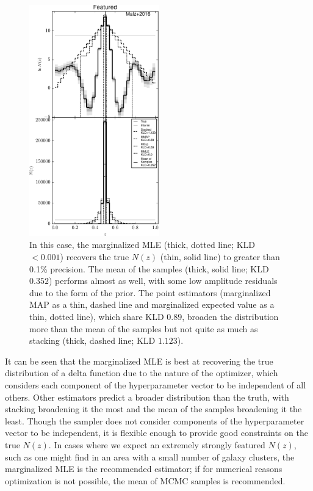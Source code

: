 \documentclass[preprint]{aastex}
\begin{document}
\begin{figure}
\includegraphics[width=0.5\textwidth]{figs/delt/comps.pdf}
\caption{In this case, the marginalized MLE (thick, dotted line; KLD $<0.001$) 
recovers the true $N(z)$ (thin, solid line) to greater than 0.1\% precision.  
The mean of the samples (thick, solid line; KLD $0.352$) performs almost as 
well, with some low amplitude residuals due to the form of the prior.  The 
point estimators (marginalized MAP as a thin, dashed line and marginalized 
expected value as a thin, dotted line), which share KLD $0.89$, broaden the 
distribution more than the mean of the samples but not quite as much as 
stacking (thick, dashed line; KLD $1.123$).}
\label{fig:toy-comp}
\end{figure}

It can be seen that the marginalized MLE is best at recovering the true 
distribution of a delta function due to the nature of the optimizer, which 
considers each component of the hyperparameter vector to be independent of all 
others.  Other estimators predict a broader distribution than the truth, with 
stacking broadening it the most and the mean of the samples broadening it the 
least.  Though the sampler does not consider components of the hyperparameter 
vector to be independent, it is flexible enough to provide good constraints on 
the true $N(z)$.  In cases where we expect an extremely strongly featured 
$N(z)$, such as one might find in an area with a small number of galaxy 
clusters, the marginalized MLE is the recommended estimator; if for numerical 
reasons optimization is not possible, the mean of MCMC samples is recommended.
\end{document}
